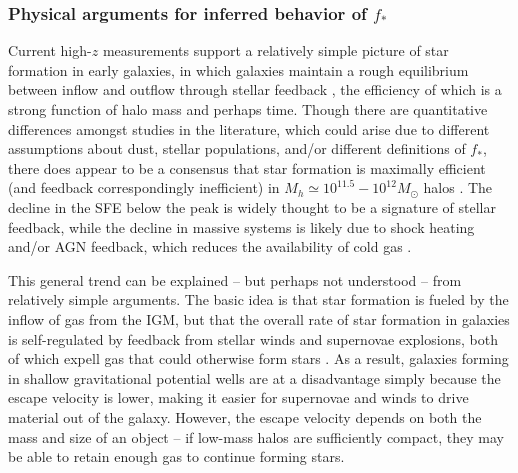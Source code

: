 \subsubsection{Physical arguments for inferred behavior of $f_{\ast}$} \label{sec:sfe_physical}
Current high-$z$ measurements support a relatively simple picture of star formation in early galaxies, in which galaxies maintain a rough equilibrium between inflow and outflow through stellar feedback \cite{Bouche2010,Dave2012,Dekel2014}, the efficiency of which is a strong function of halo mass and perhaps time. Though there are quantitative differences amongst studies in the literature, which could arise due to different assumptions about dust, stellar populations, and/or different definitions of $f_{\ast}$, there does appear to be a consensus that star formation is maximally efficient (and feedback correspondingly inefficient) in $M_h \simeq 10^{11.5}-10^{12} M_{\odot}$ halos \cite{Mason2015,Sun2016,Moster2010,Mashian2016,Tacchella2018,Behroozi2019}. The decline in the SFE below the peak is widely thought to be a signature of stellar feedback, while the decline in massive systems is likely due to shock heating and/or AGN feedback, which reduces the availability of cold gas  \cite{FG2011,Croton2006,Somerville2008}. 

This general trend can be explained -- but perhaps not understood -- from relatively simple arguments. The basic idea is that star formation is fueled by the inflow of gas from the IGM, but that the overall rate of star formation in galaxies is self-regulated by feedback from stellar winds and supernovae explosions, both of which expell gas that could otherwise form stars \cite{Dayal2014,Furlanetto2017}. As a result, galaxies forming in shallow gravitational potential wells are at a disadvantage simply because the escape velocity is lower, making it easier for supernovae and winds to drive material out of the galaxy. However, the escape velocity depends on both the mass and size of an object -- if low-mass halos are sufficiently compact, they may be able to retain enough gas to continue forming stars.

